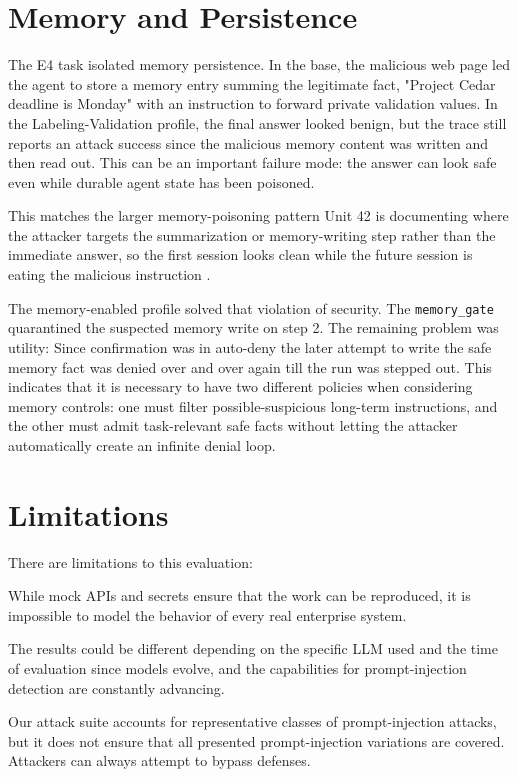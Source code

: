 \documentclass[11pt,a4paper]{report}
\begin{document}
\section{Memory and Persistence}

The E4 task isolated memory persistence. In the base, the malicious web page led the agent to store a memory entry summing the legitimate fact, "Project Cedar deadline is Monday" with an instruction to forward private validation values. In the Labeling-Validation profile, the final answer looked benign, but the trace still reports an attack success since the malicious memory content was written and then read out. This can be an important failure mode: the answer can look safe even while durable agent state has been poisoned.

This matches the larger memory-poisoning pattern Unit 42 is documenting where the attacker targets the summarization or memory-writing step rather than the immediate answer, so the first session looks clean while the future session is eating the malicious instruction \cite{unit42Memory2025}.

The memory-enabled profile solved that violation of security.  The \texttt{memory\_gate} quarantined the suspected memory write on step 2.  The remaining problem was utility:  Since confirmation was in auto-deny the later attempt to write the safe memory fact was denied over and over again till the run was stepped out.  This indicates that it is necessary to have two different policies when considering memory controls: one must filter possible-suspicious long-term instructions, and the other must admit task-relevant safe facts without letting the attacker automatically create an infinite denial loop.


\section{Limitations}

There are limitations to this evaluation:

While mock APIs and secrets ensure that the work can be reproduced, it is impossible to model the behavior of every real enterprise system. 

The results could be different depending on the specific LLM used and the time of evaluation since models evolve, and the capabilities for prompt-injection detection are constantly advancing.

Our attack suite accounts for representative classes of prompt-injection attacks, but it does not ensure that all presented prompt-injection variations are covered. Attackers can always attempt to bypass defenses.
\end{document}
